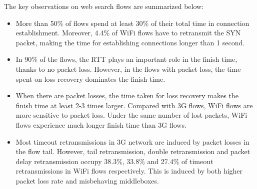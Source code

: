 The key observations on web search flows are summarized below:

\begin{itemize}
	\item More than 50\% of flows spend at least 30\% of their total time in connection establishment. Moreover, 4.4\% of WiFi flows have to retransmit the SYN packet, making the time for establishing connections longer than 1 second.
	\item In 90\% of the flows, the RTT plays an important role in the finish time, thanks to no packet loss. However, in the flows with packet loss, the time spent on loss recovery dominates the finish time.
	\item When there are packet losses, the time taken for loss recovery makes the finish time at least 2-3 times larger. Compared with 3G flows, WiFi flows are more sensitive to packet loss. Under the same number of lost packets, WiFi flows experience much longer finish time than 3G flows.
	\item Most timeout retransmissions in 3G network are induced by packet losses in the flow tail. However, tail retransmission, double retransmission and packet delay retransmission occupy 38.3\%, 33.8\% and 27.4\% of timeout retransmissions in WiFi flows respectively. This is induced by both higher packet loss rate and misbehaving middleboxes.
\end{itemize}
